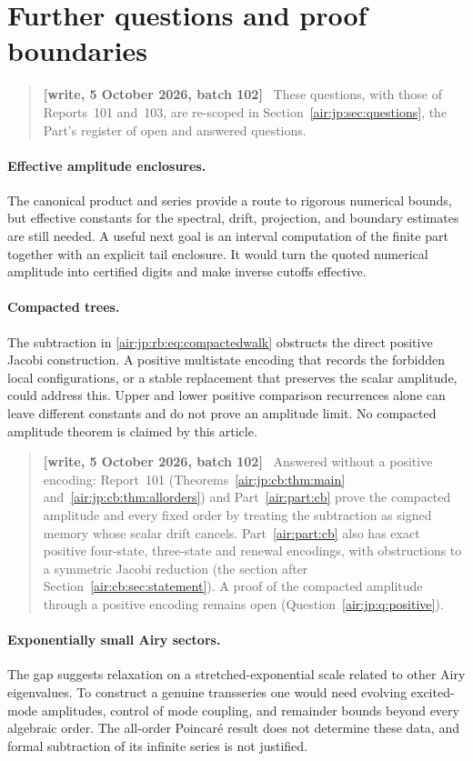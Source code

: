\documentclass[11pt,letterpaper]{article}
\numberwithin{equation}{section}
\theoremstyle{remark}
\newenvironment{writenotejp}{\par\smallskip\begin{quote}\small\textbf{[write, 5 October 2026, batch 102]}\ }{\end{quote}\smallskip}
\begin{document}
\section{Further questions and proof boundaries}\label{air:jp:rb:sec:questions}
\begin{writenotejp}
These questions, with those of Reports~101 and~103, are re-scoped in Section~\ref{air:jp:sec:questions}, the Part's register of open and answered questions.
\end{writenotejp}

\paragraph{Effective amplitude enclosures.}
The canonical product and series provide a route to rigorous numerical bounds, but effective constants for the spectral, drift, projection, and boundary estimates are still needed. A useful next goal is an interval computation of the finite part together with an explicit tail enclosure. It would turn the quoted numerical amplitude into certified digits and make inverse cutoffs effective.

\paragraph{Compacted trees.}
The subtraction in \eqref{air:jp:rb:eq:compactedwalk} obstructs the direct positive Jacobi construction. A positive multistate encoding that records the forbidden local configurations, or a stable replacement that preserves the scalar amplitude, could address this. Upper and lower positive comparison recurrences alone can leave different constants and do not prove an amplitude limit. No compacted amplitude theorem is claimed by this article.
\begin{writenotejp}
Answered without a positive encoding: Report~101 (Theorems~\ref{air:jp:cb:thm:main} and~\ref{air:jp:cb:thm:allorders}) and Part~\ref{air:part:cb} prove the compacted amplitude and every fixed order by treating the subtraction as signed memory whose scalar drift cancels. Part~\ref{air:part:cb} also has exact positive four-state, three-state and renewal encodings, with obstructions to a symmetric Jacobi reduction (the section after Section~\ref{air:cb:sec:statement}). A proof of the compacted amplitude through a positive encoding remains open (Question~\ref{air:jp:q:positive}).
\end{writenotejp}

\paragraph{Exponentially small Airy sectors.}
The gap suggests relaxation on a stretched-exponential scale related to other Airy eigenvalues. To construct a genuine transseries one would need evolving excited-mode amplitudes, control of mode coupling, and remainder bounds beyond every algebraic order. The all-order Poincar\'e result does not determine these data, and formal subtraction of its infinite series is not justified.
\end{document}
